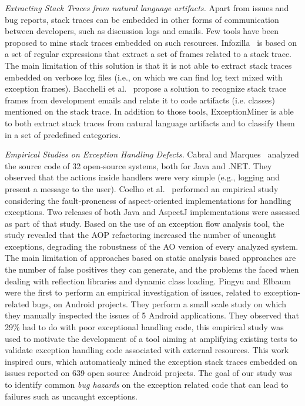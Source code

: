 \documentclass[conference]{IEEEtran}
\begin{document}
\textit{Extracting Stack Traces from natural language artifacts.} 
Apart from issues and bug reports, stack traces can be embedded in other forms of
communication between developers, such as discussion logs and emails.
Few tools have been proposed to mine stack traces embedded on such resources.
 Infozilla~\cite{bettenburg2008extracting} is based on a set of regular expressions that extract a set of frames
related to a stack trace. The main limitation of this solution is that it is not
able to extract stack traces embedded on verbose log files (i.e., on which we
can find log text mixed with exception frames). Bacchelli
et al.~\cite{bacchelli2012content} propose a solution to recognize stack trace frames
from development emails and relate it to code artifacts (i.e. classes) mentioned
on the stack trace. In addition to those tools, ExceptionMiner is able to 
both extract stack traces from natural language artifacts and to 
classify them in a set of predefined categories.

\textit{Empirical Studies on Exception Handling Defects.} 
Cabral and Marques~\cite{cabral2007exception} analyzed the
source code of 32 open-source systems, both for Java and .NET. They
observed that the actions inside handlers were very simple (e.g., logging and present a
message to the user). Coelho et al.~\cite{coelho2008assessing} performed an 
empirical study considering the fault-proneness of aspect-oriented implementations 
for handling exceptions. Two releases of both Java and AspectJ implementations were 
assessed as part of that study. Based on the use of an exception
flow analysis tool, the study revealed that the AOP  refactoring increased the 
number of uncaught exceptions, degrading the robustness of the AO version of every analyzed system.
The main limitation of approaches based on static analysis based approaches are the number of false
positives they can generate, and the problems the faced when dealing with reflection libraries 
and dynamic class loading. Pingyu and Elbaum~\cite{Zhang12} were the first to perform
an empirical investigation of issues, related to exception-related bugs, on Android projects.  
They perform a small scale study on which they manually inspected the issues of 
5 Android applications. They observed that 29\% had to do with poor
exceptional handling code, this empirical study was used to motivate the development of a tool
aiming at amplifying existing tests to validate exception 
handling code associated with external resources. This work inspired ours,
 which automaticaly mined the exception stack traces embedded on issues 
reported on 639 open source Android projects. The goal of our study was
to identify common \emph{bug hazards} on the exception related code that can lead to 
failures such as uncaught exceptions. 
\end{document}
